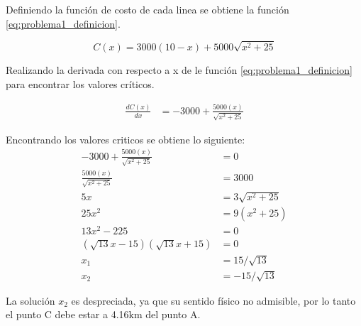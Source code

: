 Definiendo la función de costo de cada linea se obtiene la función \ref{eq:problema1_definicion}.

\begin{equation}
    C(x) = 3000(10-x) + 5000 \sqrt{x^2+25} \label{eq:problema1_definicion}
\end{equation}

Realizando la derivada con respecto a x de le función \ref{eq:problema1_definicion} para encontrar los valores críticos.

\begin{align*}
    \frac{dC(x)}{dx} & = -3000 + \frac{5000(x)}{\sqrt{x^2+25}}
\end{align*}

Encontrando los valores criticos se obtiene lo siguiente:
\begin{align*}
    -3000 + \frac{5000(x)}{\sqrt{x^2+25}} & =0               \\
    \frac{5000(x)}{\sqrt{x^2+25}}         & = 3000           \\
    5x                                    & = 3\sqrt{x^2+25} \\
    25x^2                                 & = 9(x^2+25)      \\
    13x^2     -225                        & = 0              \\
    (\sqrt{13}x-15)(\sqrt{13}x+15)        & = 0              \\
    x_1                                   & = 15/\sqrt{13}   \\
    x_2                                   & = -15/\sqrt{13}
\end{align*}

La solución $x_2$ es despreciada, ya que su sentido físico no admisible, por lo tanto el punto C debe estar a 4.16km del punto A.
